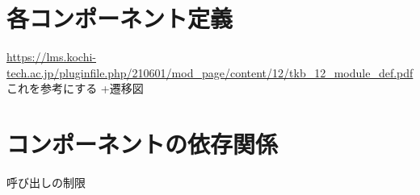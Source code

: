 \documentclass[a4paper, titlepage]{jsarticle}
\begin{document}
\section{各コンポーネント定義}
\url{https://lms.kochi-tech.ac.jp/pluginfile.php/210601/mod_page/content/12/tkb_12_module_def.pdf}これを参考にする
+遷移図
\section{コンポーネントの依存関係}
呼び出しの制限


\end{document}
